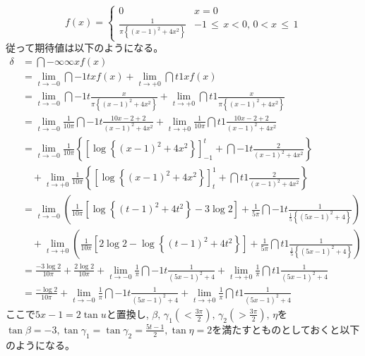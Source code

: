 \documentclass[dvipdfmx,titlepage, 11pt, a4paper]{jsarticle}%
\begin{document}
\begin{enumerate}[(1)]
\begin{equation*}
        f(x) = 
        \begin{cases}
            0 & x = 0\\
            \frac{1}{\pi\left\{\left(x - 1\right)^2 + 4x^2\right\}} & -1\, \leq\, x < 0,\, 0 < x\, \leq\, 1 
        \end{cases}
    \end{equation*}
    従って期待値は以下のようになる。
    \begin{align*}
        \delta &= \dint{-\infty}{\infty}{xf(x)}\\
        &= \lim_{t \to -0}\dint{-1}{t}{xf(x)} + \lim_{t \to +0}\dint{t}{1}{xf(x)}\\
        &= \lim_{t \to -0}\dint{-1}{t}{\frac{x}{\pi\left\{(x - 1)^2 + 4x^2\right\}}}
         + \lim_{t \to +0}\dint{t}{1}{\frac{x}{\pi\left\{(x - 1)^2 + 4x^2\right\}}}\\
        &= \lim_{t \to -0}\frac{1}{10\pi}\dint{-1}{t}{\frac{10x - 2 + 2}{(x - 1)^2 + 4x^2}} 
         + \lim_{t \to +0}\frac{1}{10\pi}\dint{t}{1}{\frac{10x - 2 + 2}{(x - 1)^2 + 4x^2}}\\
        &= \lim_{t \to -0}\frac{1}{10\pi}\left\{\left[\log\left\{(x - 1)^2 + 4x^2\right\}\right]_{-1}^{t} + \dint{-1}{t}{\frac{2}{(x - 1)^2 + 4x^2}}\right\}\\
        &\quad + \lim_{t \to +0}\frac{1}{10\pi}\left\{\left[\log\left\{(x - 1)^2 + 4x^2\right\}\right]_{t}^{1} + \dint{t}{1}{\frac{2}{(x - 1)^2 + 4x^2}}\right\}\\
        &= \lim_{t \to -0}\left(\frac{1}{10\pi}\left[\log\left\{(t - 1)^2 + 4t^2\right\} - 3\log 2\right] + \frac{1}{5\pi}\dint{-1}{t}{\frac{1}{\frac{1}{5}\left\{(5x - 1)^2 + 4\right\}}}\right)\\
        &\quad + \lim_{t \to +0}\left(\frac{1}{10\pi}\left[2\log 2 - \log\left\{(t - 1)^2 + 4t^2\right\}\right] + \frac{1}{5\pi}\dint{t}{1}{\frac{1}{\frac{1}{5}\left\{(5x - 1)^2 + 4\right\}}}\right)\\
        &= \frac{-3\log 2}{10\pi} + \frac{2\log 2}{10\pi} + \lim_{t \to -0}\frac{1}{\pi}\dint{-1}{t}{\frac{1}{(5x - 1)^2 + 4}} + \lim_{t \to +0}\frac{1}{\pi}\dint{t}{1}{\frac{1}{(5x - 1)^2 + 4}}\\
        &= \frac{-\log 2}{10\pi} + \lim_{t \to -0}\frac{1}{\pi}\dint{-1}{t}{\frac{1}{(5x - 1)^2 + 4}} + \lim_{t \to +0}\frac{1}{\pi}\dint{t}{1}{\frac{1}{(5x - 1)^2 + 4}}
    \end{align*}
    ここで$5x - 1 = 2\tan u$と置換し, $\beta,\, \gamma_1(< \frac{3\pi}{2}),\, \gamma_2(> \frac{3\pi}{2}),\, \eta$を$\tan\beta = -3, \tan\gamma_1 = \tan\gamma_2 = \frac{5t - 1}{2}, \tan\eta = 2$を満たすとものとしておくと以下のようになる。

\end{enumerate}
\end{document}
